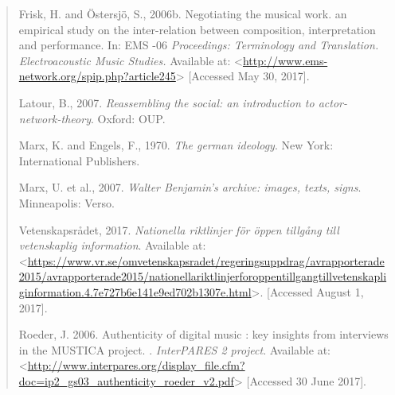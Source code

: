 \begin{quote}
Frisk, H. and Östersjö, S., 2006b. Negotiating the musical work. an
empirical study on the inter-relation between composition,
interpretation and performance. In: EMS -06 \emph{Proceedings:
Terminology and Translation. Electroacoustic Music Studies.} Available
at:
\textless{}{\url{http://www.ems-network.org/spip.php?article245}\textgreater{}}
{[}Accessed May 30, 2017{]}.

Latour, B., 2007. \emph{Reassembling the social: an introduction to
actor-network-theory}. Oxford: OUP.

Marx, K. and Engels, F., 1970. \emph{The german ideology}. New York:
International Publishers.

Marx, U. et al., 2007. \emph{Walter Benjamin's archive: images, texts,
signs}. Minneapolis: Verso.

Vetenskapsrådet, 2017. \emph{Nationella riktlinjer för öppen tillgång
till vetenskaplig information}. Available
at:\textless{}{\url{https://www.vr.se/omvetenskapsradet/regeringsuppdrag/avrapporterade2015/avrapporterade2015/nationellariktlinjerforoppentillgangtillvetenskapliginformation.4.7e727b6e141e9ed702b1307e.html}\textgreater{}}.
{[}Accessed August 1, 2017{]}.

Roeder, J. 2006. Authenticity of digital music : key insights from
interviews in the MUSTICA project. . \emph{InterPARES 2 project}.
Available
at:\textless{}\href{http://www.interpares.org/display_file.cfm?doc=ip2_gs03_authenticity_roeder_v2.pdf}{{http://www.interpares.org/display\_file.cfm?doc=ip2\_gs03\_authenticity\_roeder\_v2.pdf}}\textgreater{}
{[}Accessed 30 June 2017{]}.
\end{quote}
